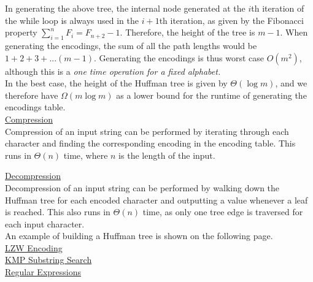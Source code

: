 \documentclass[12pt, fleqn]{general}
\begin{document}
\begin{multicols*}{2}
    In generating the above tree, the internal node generated at the $i$th iteration of the while loop is always used in the $i+1$th iteration, as given by the Fibonacci property  $\sum_{i=1}^n F_i = F_{n+2} - 1$. Therefore, the height of the tree is $m-1$. When generating the encodings, the sum of all the path lengths would be $1 + 2 + 3 + ... (m-1)$. Generating the encodings is thus worst case $O(m^2)$, although this is a \emph{one time operation for a fixed alphabet.}\\

    In the best case, the height of the Huffman tree is given by $\Theta(\log m)$, and we therefore have $\Omega(m \log m)$ as a lower bound for the runtime of generating the encodings table.\\

    \underline{Compression}\\

    Compression of an input string can be performed by iterating through each character and finding the corresponding encoding in the encoding table. This runs in $\Theta(n)$ time, where $n$ is the length of the input.\\

    \end{multicols*}

    \underline{Decompression}\\

    Decompression of an input string can be performed by walking down the Huffman tree for each encoded character and outputting a value whenever a leaf is reached. This also runs in $\Theta(n)$ time, as only one tree edge is traversed for each input character.\\

    An example of building a Huffman tree is shown on the following page.\\

    {\large \underline{LZW Encoding}}\\

    {\large \underline{KMP Substring Search}}\\
    
    {\large \underline{Regular Expressions}}\\

    \newpage
\end{document}
